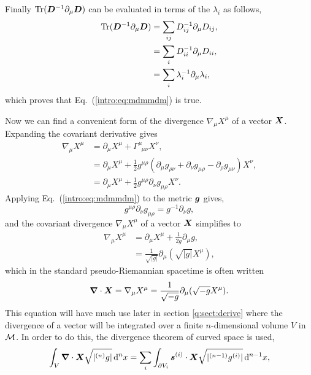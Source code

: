 Finally $\mathrm{Tr}(\boldsymbol{D}^{-1} \partial_\mu \boldsymbol{D})$ can be evaluated in terms of the $\lambda_i$ as follows,
\begin{align}
\mathrm{Tr}(\boldsymbol{D}^{-1} \partial_\mu \boldsymbol{D}) &= \sum_{ij} D^{-1}_{ij} \partial_\mu D_{ij} ,\\
&= \sum_i D^{-1}_{ii} \partial_\mu D_{ii} ,\\
&= \sum_i \lambda_i^{-1} \partial_\mu \lambda_i,
\end{align}
which proves that Eq.~(\ref{intro:eq:mdmmdm}) is true.


Now we can find a convenient form of the divergence $\nabla_\mu X^\mu$ of a vector $\boldsymbol{X}$. Expanding the covariant derivative gives
\begin{align}
\nabla_\mu X^\mu &= \partial_\mu X^\mu + \Gamma^\mu_{\,\,\,\mu\nu}X^\nu , \\
&= \partial_\mu X^\mu + \frac{1}{2}g^{\mu\rho}\left(\partial_\mu g_{\rho\nu}+\partial_\nu g_{\mu\rho}-\partial_\rho g_{\mu\nu}\right)X^\nu , \\
&= \partial_\mu X^\mu + \frac{1}{2}g^{\mu\rho}\partial_\nu g_{\mu\rho}X^\nu. 
\end{align}
Applying Eq.~(\ref{intro:eq:mdmmdm}) to the metric $\boldsymbol{g}$ gives,
\begin{equation} \label{intro:eq:gdggdg}
g^{\mu\rho}\partial_\nu g_{\mu\rho} = g^{-1} \partial_\nu g,
\end{equation}
and the covariant divergence $\nabla_\mu X^\mu$ of a vector $\boldsymbol{X}$ simplifies to 
\begin{align}
\nabla_\mu X^\mu &= \partial_\mu X^\mu + \frac{1}{2g}\partial_\mu g ,\\
&= \frac{1}{\sqrt{|g|}}\partial_\mu \left(\sqrt{|g|}X^\mu\right),
\end{align}
which in the standard pseudo-Riemannian spacetime is often written
\begin{equation} \label{intro:eq:div_vector}
\boldsymbol{\nabla}\cdot \boldsymbol{X} = \nabla_\mu X^\mu = \frac{1}{\sqrt{-g}}\partial_\mu (\sqrt{-g}X^\mu).
\end{equation}
This equation will have much use later in section \ref{q:sect:derive} where the divergence of a vector will be integrated over a finite $n$-dimensional volume $V$ in $\mathcal{M}$. In order to do this, the divergence theorem of curved space is used, 
\begin{equation} \label{intro:eq:properdivtheorem}
\int_V \boldsymbol{\nabla} \cdot \boldsymbol{X} \sqrt{|{}^{(n)}g|} \,\dd^n x = \sum_i \int_{\partial V_i} \boldsymbol{s}^{(i)} \cdot \boldsymbol{X} \sqrt{|{}^{(n-1)}g^{(i)}|} \,\dd^{n-1} x,
\end{equation}
